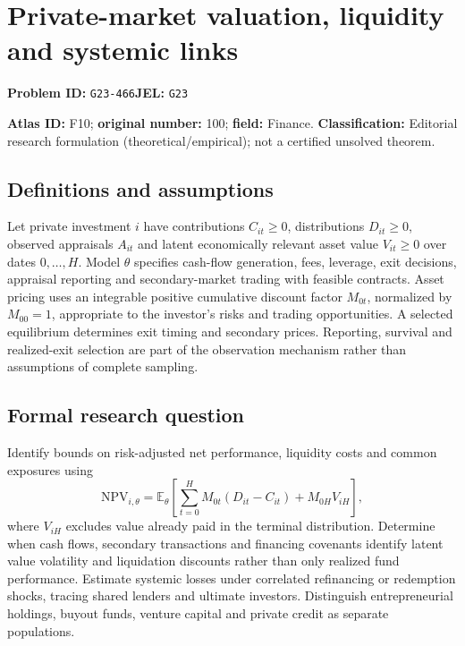 \documentclass[11pt,a4paper]{article}
\begin{document}
\section*{Private-market valuation, liquidity and systemic links}
\textbf{Problem ID:} \texttt{G23-466}\quad \textbf{JEL:} \texttt{G23}\par
\label{problem:OP-0100}
\label{atlas:prob:F10}

\noindent\textbf{Atlas ID:} F10; \textbf{original number:} 100; \textbf{field:} Finance. \textbf{Classification:} Editorial research formulation (theoretical/empirical); not a certified unsolved theorem.

\subsection*{Definitions and assumptions}
Let private investment $i$ have contributions $C_{it}\ge0$, distributions $D_{it}\ge0$, observed appraisals $A_{it}$ and latent economically relevant asset value $V_{it}\ge0$ over dates $0,\ldots,H$. Model $\theta$ specifies cash-flow generation, fees, leverage, exit decisions, appraisal reporting and secondary-market trading with feasible contracts. Asset pricing uses an integrable positive cumulative discount factor $M_{0t}$, normalized by $M_{00}=1$, appropriate to the investor’s risks and trading opportunities. A selected equilibrium determines exit timing and secondary prices. Reporting, survival and realized-exit selection are part of the observation mechanism rather than assumptions of complete sampling.

\subsection*{Formal research question}
Identify bounds on risk-adjusted net performance, liquidity costs and common exposures using
\[
 \mathrm{NPV}_{i,\theta}=\mathbb E_\theta\!\left[
 \sum_{t=0}^{H}M_{0t}(D_{it}-C_{it})+M_{0H}V_{iH}\right],
\]
where $V_{iH}$ excludes value already paid in the terminal distribution. Determine when cash flows, secondary transactions and financing covenants identify latent value volatility and liquidation discounts rather than only realized fund performance. Estimate systemic losses under correlated refinancing or redemption shocks, tracing shared lenders and ultimate investors. Distinguish entrepreneurial holdings, buyout funds, venture capital and private credit as separate populations.
\end{document}
